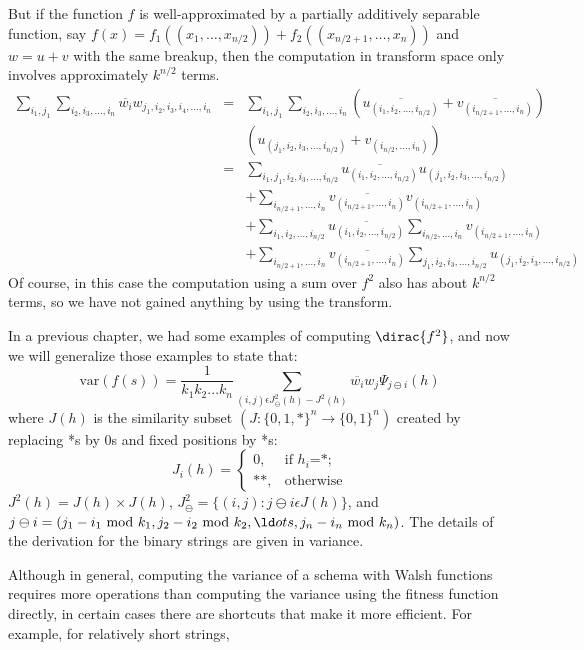 But if the function $f$ is well-approximated by
a partially additively separable function, say $f(x)=f_1((x_1,\ldots,
x_{n/2})) + f_2((x_{n/2+1},\ldots,x_n))$ and $w=u+v$ with the same breakup,
then the computation in transform space only involves approximately $k^{n/2}$
terms.
\begin{eqnarray}
\sum_{i_1,j_1} \sum_{i_2,i_3,\ldots,i_n}
        \overline{w_i} w_{j_1,i_2,i_3,i_4,\ldots,i_n} &=&
\sum_{i_1,j_1} \sum_{i_2,i_3,\ldots,i_n}
(\overline{u_{(i_1,i_2,\ldots,i_{n/2})}}
+ \overline{v_{(i_{n/2+1},\ldots,i_{n})}}) \nonumber\\
 &&
(u_{(j_1,i_2,i_3,\ldots,i_{n/2})} + v_{(i_{n/2},\ldots,i_n)}) \nonumber \\
&=&
\sum_{i_1,j_1,i_2,i_3,\ldots,i_{n/2}} {
\overline{u_{(i_1,i_2,\ldots,i_{n/2})}}
u_{(j_1,i_2,i_3,\ldots,i_{n/2})} } \nonumber \\
&&+
\sum_{i_{n/2+1},\ldots,i_n} {
\overline{v_{(i_{n/2+1},\ldots,i_{n})}}
v_{(i_{n/2+1},\ldots,i_n)}
} \nonumber\\
&&+
\sum_{i_1,i_2,\ldots,i_{n/2}} {
\overline{u_{(i_1,i_2,\ldots,i_{n/2})}} }
\sum_{i_{n/2},\ldots,i_n} {
v_{(i_{n/2+1},\ldots,i_n)} } \nonumber\\
&&
+\sum_{i_{n/2+1},\ldots,i_n} {
\overline{v_{(i_{n/2+1},\ldots,i_{n})}} }
\sum_{j_1,i_2,i_3,\ldots,i_{n/2}}
u_{(j_1,i_2,i_3,\ldots,i_{n/2})}
\end{eqnarray}
Of course, in this case the computation using a sum over $f^2$ also has
about $k^{n/2}$ terms, so we have not gained anything by using the transform.




In a previous chapter, we had some examples of computing $\dirac{f^2}$, and
now we will generalize those examples to state that:
\begin{equation}
\mbox{var}(f(s))=\frac{1}{k_1 k_2 \ldots k_n}\sum_{(i,j) \epsilon J^2_{\ominus}(
h)-J^2(h)}{
        \overline{w_i} w_j \Psi_{j \ominus i}(h)}
\end{equation}
where $J(h)$ is the similarity subset $(J:\{0,1,*\}^n \rightarrow \{0,1\}^n)$
created by replacing *s by 0s and fixed positions by *s:
\begin{equation}
J_i(h)=\left\{\begin{array}{ll}
        0,&\mbox{if $h_i$=*;}\\
        **,&\mbox{otherwise}
        \end{array}\right.
\end{equation}
$J^2(h)=J(h) \times J(h)$, $J^2_{\ominus}=\{(i,j):j\ominus i \epsilon J(h)
\}$, and $j \ominus i=(j_1-i_1 \mbox{\ mod\ } k_1,j_2-i_2 \mbox{\ mod\ } k_2,\ld
ots,
        j_n-i_n \mbox{\ mod\ } k_n)$.
The details of the derivation for the binary strings are given in {variance}.

Although in general, computing the variance of a schema with Walsh functions
requires more operations than computing the variance using the fitness
function directly, in certain cases there are shortcuts that make it more
efficient.  For example, for relatively short strings,


